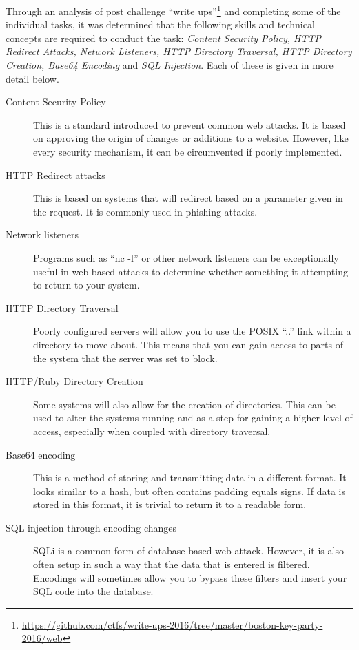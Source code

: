 \documentclass[twoside,a4paper,11pt]{report}
\begin{document}
			Through an analysis of post challenge ``write ups''\footnote{\url{https://github.com/ctfs/write-ups-2016/tree/master/boston-key-party-2016/web}}
			and completing some of the individual tasks, 
			it was determined that the following skills and technical concepts are required to conduct the task: 
			\textit{Content Security Policy, HTTP Redirect Attacks, Network Listeners, HTTP Directory Traversal, HTTP Directory Creation, Base64 Encoding} and \textit{SQL Injection}.
			Each of these is given in more detail below. 
			\begin{description}
				\item[Content Security Policy]
					This is a standard introduced to prevent common web attacks. 
					It is based on approving the origin of changes or additions to a website. 
					However, like every security mechanism, it can be circumvented if poorly implemented. 
				\item[HTTP Redirect attacks] 
					This is based on systems that will redirect based on a parameter given in the request. 
					It is commonly used in phishing attacks. 
				\item[Network listeners] 
					Programs such as ``nc -l'' or other network listeners can be exceptionally useful in web based attacks to determine whether something it attempting to return to your system. 
				\item[HTTP Directory Traversal] 
					Poorly configured servers will allow you to use the POSIX ``..'' link within a directory to move about. 
					This means that you can gain access to parts of the system that the server was set to block. 
				\item[HTTP/Ruby Directory Creation] 
					Some systems will also allow for the creation of directories. 
					This can be used to alter the systems running and as a step for gaining a higher level of access, especially when coupled with directory traversal. 
				\item[Base64 encoding] 
					This is a method of storing and transmitting data in a different format. 
					It looks similar to a hash, but often contains padding equals signs. 
					If data is stored in this format, it is trivial to return it to a readable form. 
				\item[SQL injection through encoding changes] 
					SQLi is a common form of database based web attack. 
					However, it is also often setup in such a way that the data that is entered is filtered. 
					Encodings will sometimes allow you to bypass these filters and insert your SQL code into the database. 
			\end{description}
\end{document}
